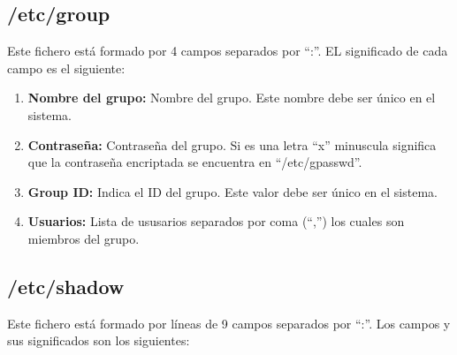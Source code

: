 \documentclass{article}
\begin{document}
\subsection{/etc/group}
Este fichero está formado por 4 campos separados por ``:''. EL significado de cada campo es el siguiente:

\begin{enumerate}
    \item \textbf{Nombre del grupo: }Nombre del grupo. Este nombre debe ser único en el sistema.
    
    \item \textbf{Contraseña: }Contraseña del grupo. Si es una letra ``x'' minuscula significa que la contraseña encriptada se encuentra en ``/etc/gpasswd''.
    \item \textbf{Group ID: }Indica el ID del grupo. Este valor debe ser único en el sistema.
    \item \textbf{Usuarios: }Lista de ususarios separados por coma (``,'') los cuales son miembros del grupo. 
\end{enumerate}
\subsection{/etc/shadow}
Este fichero está formado por líneas de 9 campos separados por ``:''. Los campos y sus significados son los siguientes:
\end{document}
